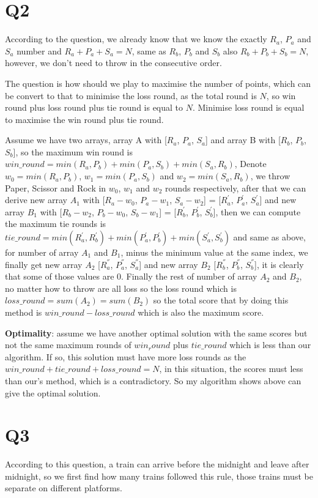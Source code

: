 \documentclass[a4paper]{article}
\begin{document}
	\section*{Q2}
	According to the question, we already know that we know the exactly $R_a$, $P_a$ and $S_a$ number and $R_a + P_a + S_a = N$, same as $R_b$, $P_b$ and $S_b$ also $R_b + P_b + S_b = N$, however, we don't need to throw in the consecutive order.
	
	The question is how should we play to maximise the number of points, which can be convert to that to minimise the loss round, as the total round is $N$, so win round plus loss round plus tie round is equal to $N$. Minimise loss round is equal to maximise the win round plus tie round.
	
	Assume we have two arrays, array A with [$R_a$, $P_a$, $S_a$] and array B with [$R_b$, $P_b$, $S_b$], so the maximum win round is $win\_round = min(R_a, P_b) + min(P_a, S_b) + min(S_a, R_b)$, Denote $w_0 = min(R_a, P_b)$, $w_1 = min(P_a, S_b)$ and $w_2 = min(S_a, R_b)$, we throw Paper, Scissor and Rock in $w_0$, $w_1$ and $w_2$ rounds respectively, after that we can derive new array $A_1$ with [$R_a - w_0$, $P_a - w_1$, $S_a - w_2$] = [$R_a^{'}$, $P_a^{'}$, $S_a^{'}$] and new array $B_1$ with [$R_b - w_2$, $P_b - w_0$, $S_b - w_1$] = [$R_b^{'}$, $P_b^{'}$, $S_b^{'}$], then we can compute the maximum tie rounds is $tie\_round = min(R_a^{'}, R_b^{'}) + min(P_a^{'}, P_b^{'}) + min(S_a^{'}, S_b^{'})$ and same as above, for number of array $A_1$ and $B_1$, minus the minimum value at the same index, we finally get new array $A_2$ [$R_a^{''}$, $P_a^{''}$, $S_a^{''}$] and new array $B_2$ [$R_b^{''}$, $P_b^{''}$, $S_b^{''}$], it is clearly that some of those values are $0$. Finally the rest of number of array $A_2$ and $B_2$, no matter how to throw are all loss so the loss round which is $loss\_round = sum(A_2) = sum(B_2)$ so the total score that by doing this method is $win\_round - loss\_round$ which is also the maximum score.
	
	\textbf{Optimality}: assume we have another optimal solution with the same scores but not the same maximum rounds of $win_round$ plus $tie\_round$ which is less than our algorithm. If so, this solution must have more loss rounds as the $win\_round + tie\_round + loss\_round = N$, in this situation, the scores must less than our's method, which is a contradictory. So my algorithm shows above can give the optimal solution.
	 

	\section*{Q3}
	According to this question, a train can arrive before the midnight and leave after midnight, so we first find how many trains followed this rule, those trains must be separate on different platforms. 
	
\end{document}
